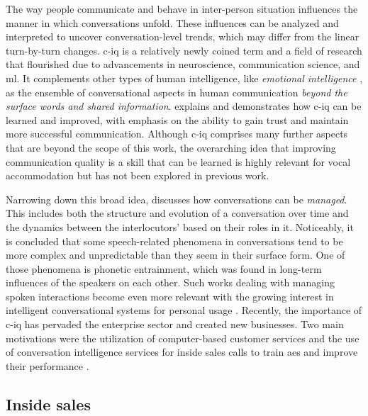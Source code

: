 The way people communicate and behave in inter-person situation influences the manner in which conversations unfold.
These influences can be analyzed and interpreted to uncover conversation-level trends, which may differ from the linear turn-by-turn changes.
\Acf{c-iq} is a relatively newly coined term and a field of research that flourished due to advancements in neuroscience, communication science, and \acl{ml}.
It complements other types of human intelligence, like \emph{emotional intelligence} \citep[c.f.\ \emph{Theory of Multiple Intelligences}][]{Gardner1983frames, Davis2011theory}, as the ensemble of conversational aspects in human communication \emph{beyond the surface words and shared information}.
\citet{Glaser2016conversational} explains and demonstrates how \ac{c-iq} can be learned and improved, with emphasis on the ability to gain trust and maintain more successful communication.
Although \ac{c-iq} comprises many further aspects that are beyond the scope of this work, the overarching idea that improving communication quality is a skill that can be learned is highly relevant for vocal accommodation but has not been explored in previous work.

Narrowing down this broad idea, \citet{SilberVarod2018human} discusses how conversations can be \emph{managed}.
This includes both the structure and evolution of a conversation over time and the dynamics between the interlocutors' based on their roles in it.
Noticeably, it is concluded that some speech-related phenomena in conversations tend to be more complex and unpredictable than they seem in their surface form.
One of those phenomena is phonetic entrainment, which was found in long-term influences of the speakers on each other.
Such works dealing with managing spoken interactions become even more relevant with the growing interest in intelligent conversational systems for personal usage \citep{Mehr2017artificial}.
Recently, the importance of \ac{c-iq} has pervaded the enterprise sector and created new businesses.
Two main motivations were the utilization of computer-based customer services \citep{Gnewuch2017towards} and the use of conversation intelligence services for inside sales calls to train \acp{ae} and improve their performance \citep{Orlob2017winning, Orlob2017separates}.

\subsection{Inside sales}
\label{subsec:inside_sales}

